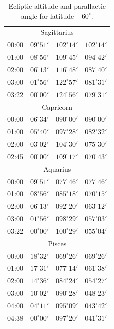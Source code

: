 \begin{table}[!h]
\begin{Parallel}{}{}
{{\begin{tabular}{l|lll}
\multicolumn{4}{c}{Sagittarius}\\
00:00 & $09^\circ 51'$ & $102^\circ 14'$& $102^\circ 14'$ \\
01:00 & $08^\circ 56'$ & $109^\circ 45'$& $094^\circ 42'$ \\
02:00 & $06^\circ 13'$ & $116^\circ 48'$& $087^\circ 40'$ \\
03:00 & $01^\circ 56'$ & $122^\circ 57'$& $081^\circ 31'$ \\
03:22 & $00^\circ 00'$ & $124^\circ 56'$& $079^\circ 31'$ \\
\multicolumn{4}{c}{Capricorn}\\
00:00 & $06^\circ 34'$ & $090^\circ 00'$& $090^\circ 00'$ \\
01:00 & $05^\circ 40'$ & $097^\circ 28'$& $082^\circ 32'$ \\
02:00 & $03^\circ 02'$ & $104^\circ 30'$& $075^\circ 30'$ \\
02:45 & $00^\circ 00'$ & $109^\circ 17'$& $070^\circ 43'$ \\
\multicolumn{4}{c}{Aquarius}\\
00:00 & $09^\circ 51'$ & $077^\circ 46'$& $077^\circ 46'$ \\
01:00 & $08^\circ 56'$ & $085^\circ 18'$& $070^\circ 15'$ \\
02:00 & $06^\circ 13'$ & $092^\circ 20'$& $063^\circ 12'$ \\
03:00 & $01^\circ 56'$ & $098^\circ 29'$& $057^\circ 03'$ \\
03:22 & $00^\circ 00'$ & $100^\circ 29'$& $055^\circ 04'$ \\
\multicolumn{4}{c}{Pisces}\\
00:00 & $18^\circ 32'$ & $069^\circ 26'$& $069^\circ 26'$ \\
01:00 & $17^\circ 31'$ & $077^\circ 14'$& $061^\circ 38'$ \\
02:00 & $14^\circ 36'$ & $084^\circ 24'$& $054^\circ 27'$ \\
03:00 & $10^\circ 02'$ & $090^\circ 28'$& $048^\circ 23'$ \\
04:00 & $04^\circ 11'$ & $095^\circ 09'$& $043^\circ 42'$ \\
04:38 & $00^\circ 00'$ & $097^\circ 20'$& $041^\circ 31'$ \\
\end{tabular}
}}
\end{Parallel}
\caption{Ecliptic altitude and parallactic angle for latitude $+60^\circ$.}
\end{table}

